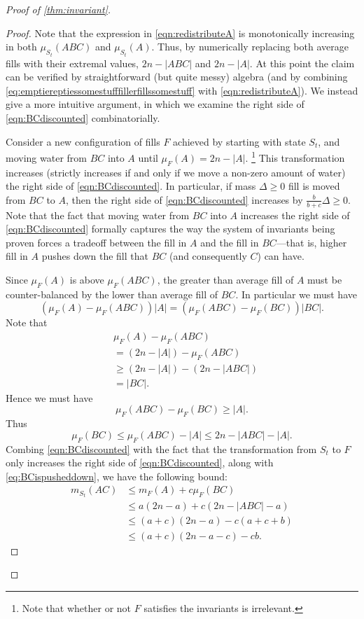 \documentclass[twocolumn]{article}[10pt]
\begin{document}
\begin{proof}[Proof of \cref{thm:invariant}]
\begin{proof}
Note that the expression in \eqref{eqn:redistributeA} is monotonically
increasing in both $\mu_{S_t}(ABC)$ and $\mu_{S_t}(A)$. Thus, by numerically
replacing both average fills with their extremal values, $2n-|ABC|$ and
$2n-|A|$. At this point the claim can be verified by straightforward (but quite
messy) algebra (and by combining
\eqref{eq:emptiereptiessomestufffillerfillssomestuff} with
\eqref{eqn:redistributeA}). We instead give a more intuitive argument, in which
we examine the right side of \eqref{eqn:BCdiscounted} combinatorially.

 Consider a new configuration of fills $F$ achieved by starting with state
 $S_t$, and moving water from $BC$ into $A$ until $\mu_{F}(A) = 2n-|A|$.
 \footnote{Note that whether or not $F$ satisfies the invariants is
 irrelevant.} This transformation increases (strictly increases if and only if
 we move a non-zero amount of water) the right side of
 \eqref{eqn:BCdiscounted}. In particular, if mass $\Delta \ge 0$ fill is moved
 from $BC$ to $A$, then the right side of \eqref{eqn:BCdiscounted} increases by
 $\frac{b}{b+c} \Delta \ge 0$. Note that the fact that moving water from $BC$
 into $A$ increases the right side of \eqref{eqn:BCdiscounted} formally
 captures the way the system of invariants being proven forces a tradeoff
 between the fill in $A$ and the fill in $BC$---that is, higher fill in $A$
 pushes down the fill that $BC$ (and consequently $C$) can have.

  Since $\mu_F(A)$ is above $\mu_{F}(ABC)$, the greater than average fill of
  $A$ must be counter-balanced by the lower than average fill of $BC$. In
  particular we must have
  $$(\mu_F(A) - \mu_F(ABC))|A| = (\mu_F(ABC) -\mu_F(BC))|BC|.$$
  Note that 
  \begin{align*}
  & \mu_F(A) -\mu_F(ABC) \\
  &= (2n-|A|) - \mu_F(ABC) \\
  &\ge (2n-|A|) - (2n-|ABC|) \\
  &= |BC|.    
  \end{align*}
  Hence we must have 
  $$\mu_F(ABC) - \mu_F(BC) \ge |A|.$$
  Thus 
  \begin{equation}
      \mu_F(BC) \le \mu_F(ABC) - |A| \le 2n-|ABC| -|A|.
      \label{eq:BCispusheddown}
  \end{equation}
  Combing \eqref{eqn:BCdiscounted} with the fact that the transformation from
  $S_t$ to $F$ only increases the right side of \eqref{eqn:BCdiscounted}, along
  with \eqref{eq:BCispusheddown}, we have the following bound:
  \begin{align}
    m_{S_t}(AC)
  &\le m_{F}(A) + c\mu_{F}(BC) \nonumber \\
  &\le a(2n-a) + c(2n-|ABC|-a) \nonumber \\
  &\le (a+c)(2n-a) - c(a+c+b) \nonumber \\
  &\le (a+c)(2n-a-c) - cb. \label{eq:eqnwithcb}
  \end{align}
  

\end{proof}
\end{proof}
\end{document}
